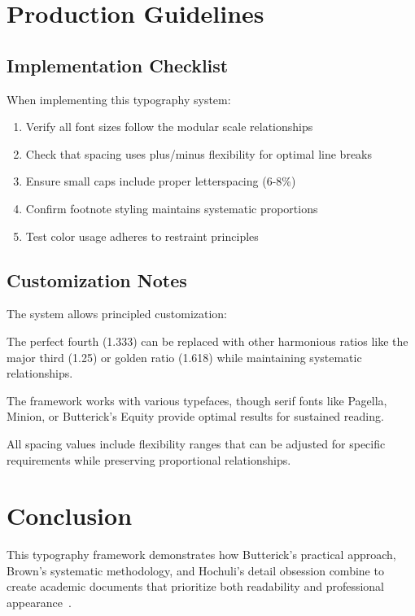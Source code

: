 \documentclass[11pt]{article}
\begin{document}
\section{Production Guidelines}

\subsection{Implementation Checklist}

When implementing this typography system:

\begin{enumerate}
\item Verify all font sizes follow the modular scale relationships
\item Check that spacing uses plus/minus flexibility for optimal line breaks  
\item Ensure small caps include proper letterspacing (6-8\%)
\item Confirm footnote styling maintains systematic proportions
\item Test color usage adheres to restraint principles
\end{enumerate}

\subsection{Customization Notes}

The system allows principled customization:

 The perfect fourth (1.333) can be replaced with other harmonious ratios like the major third (1.25) or golden ratio (1.618) while maintaining systematic relationships.

 The framework works with various typefaces, though serif fonts like Pagella, Minion, or Butterick's Equity provide optimal results for sustained reading.

 All spacing values include flexibility ranges that can be adjusted for specific requirements while preserving proportional relationships.

\section{Conclusion}

This typography framework demonstrates how Butterick's practical approach, Brown's systematic methodology, and Hochuli's detail obsession combine to create academic documents that prioritize both readability and professional appearance~\parencite{butterick2019practical, brown2018flexible, hochuli1987detail}. 
\end{document}
